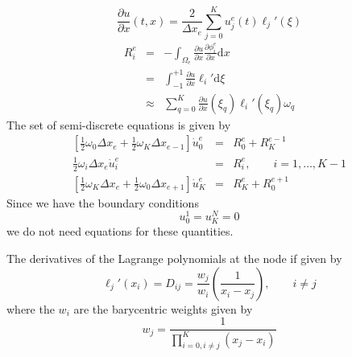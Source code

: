 \documentclass[12pt, oneside]{article}   	%
\newcommand{\ud}{\textrm{d}}
\newcommand{\half}{\frac{1}{2}}
\newcommand{\df}[2]{\frac{\partial #1}{\partial #2}}
\begin{document}
\[
\df{u}{x}(t,x) = \frac{2}{\Delta x_e} \sum_{j=0}^K u_j^e(t) \ell_j'(\xi)
\]
\begin{eqnarray*}
R_i^e &=& -\int_{\Omega_e} \df{u}{x} \df{\phi_i^e}{x} \ud x \\
&=& \int_{-1}^{+1} \df{u}{x} \ell_i' \ud\xi \\
&\approx& \sum_{q=0}^K \df{u}{x}(\xi_q) \ell_i'(\xi_q) \omega_q
\end{eqnarray*}
The set of semi-discrete equations is given by
\begin{eqnarray*}
\left[ \half \omega_0 \Delta x_e + \half \omega_K \Delta x_{e-1} \right] \dot{u}_0^e &=& R_0^e + R_K^{e-1} \\
\half \omega_i \Delta x_e \dot{u}_i^e &=& R_i^e, \qquad i=1,\ldots,K-1\\
\left[ \half \omega_K \Delta x_e + \half \omega_0 \Delta x_{e+1} \right] \dot{u}_K^e &=& R_K^e + R_0^{e+1}
\end{eqnarray*}
Since we have the boundary conditions
\[
u_0^1 = u_K^N = 0
\]
we do not need equations for these quantities.

The derivatives of the Lagrange polynomials at the node if given by
\[
\ell_j'(x_i) = D_{ij} = \frac{w_j}{w_i} \left(\frac{1}{x_i - x_j}\right), \qquad i \ne j
\]
where the $w_i$ are the barycentric weights given by
\[
w_j = \frac{1}{\prod_{i=0, i\ne j}^K (x_j - x_i)}
\]
\end{document}
